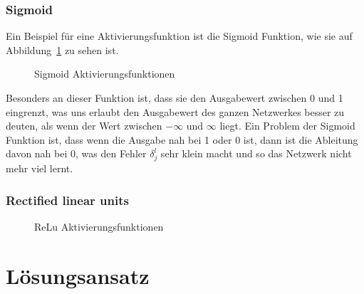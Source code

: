 \documentclass[12pt,a4paper]{report}
\begin{document}
\subsection{Sigmoid}
Ein Beispiel für eine Aktivierungsfunktion ist die Sigmoid Funktion, wie sie auf Abbildung~\ref{fig:activation1} zu sehen ist.
\begin{figure}[h]
    \centering
{}
    \caption{Sigmoid Aktivierungsfunktionen}
    \label{fig:activation1}
\end{figure}
Besonders an dieser Funktion ist, dass sie den Ausgabewert zwischen 0 und 1 eingrenzt, was uns erlaubt den Ausgabewert des ganzen
Netzwerkes besser zu deuten, als wenn der Wert zwischen $-\infty$ und $\infty$ liegt.
Ein Problem der Sigmoid Funktion ist, dass wenn die Ausgabe nah bei 1 oder 0 ist, dann ist die Ableitung davon nah bei 0,
was den Fehler $\delta^l_j$ sehr klein macht und so das Netzwerk nicht mehr viel lernt.
\subsection{Rectified linear units}
\begin{figure}[h]
    \centering
{}
    \caption{ReLu Aktivierungsfunktionen}
    \label{fig:activation2}
\end{figure}



\chapter{Lösungsansatz}
\label{ch:lösungsansatz}
\end{document}
